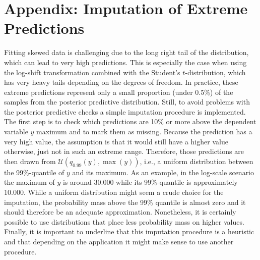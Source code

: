 \chapter{Appendix: Imputation of Extreme Predictions}
\label{ch:imputation}
Fitting skewed data is challenging due to the long right tail of the distribution, which can lead to very high predictions.
This is especially the case when using the log-shift transformation combined with the Student's $t$-distribution, which has very heavy tails depending on the degrees of freedom.
In practice, these extreme predictions represent only a small proportion (under 0.5\%) of the samples from the posterior predictive distribution.
Still, to avoid problems with the posterior predictive checks a simple imputation procedure is implemented.
The first step is to check which predictions are 10\% or more above the dependent variable $y$ maximum and to mark them as missing.
Because the prediction has a very high value, the assumption is that it would still have a higher value otherwise, just not in such an extreme range.
Therefore, those predictions are then drawn from $\mathcal U(q_{0.99}(y), \max(y))$, i.e., a uniform distribution between the 99\%-quantile of $y$ and its maximum.
As an example, in the log-scale scenario the maximum of $y$ is around 30.000 while its 99\%-quantile is approximately 10.000.
While a uniform distribution might seem a crude choice for the imputation, the probability mass above the 99\% quantile is almost zero and it should therefore be an adequate approximation.
Nonetheless, it is certainly possible to use distributions that place less probability mass on higher values.
Finally, it is important to underline that this imputation procedure is a heuristic and that depending on the application it might make sense to use another procedure.